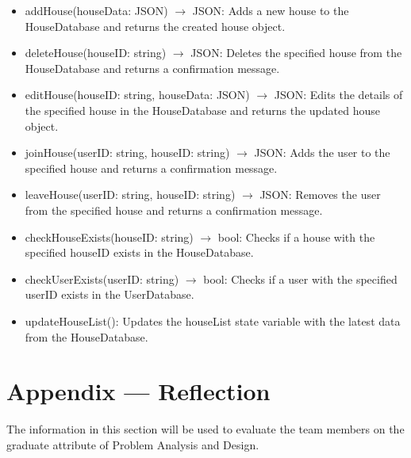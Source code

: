 \documentclass[12pt, titlepage]{article}
\begin{document}
\begin{itemize}
  \item addHouse(houseData: JSON) $\rightarrow$ JSON: Adds a new house to the HouseDatabase and returns the created house object.
  \item deleteHouse(houseID: string) $\rightarrow$ JSON: Deletes the specified house from the HouseDatabase and returns a confirmation message.
  \item editHouse(houseID: string, houseData: JSON) $\rightarrow$ JSON: Edits the details of the specified house in the HouseDatabase and returns the updated house object.
  \item joinHouse(userID: string, houseID: string) $\rightarrow$ JSON: Adds the user to the specified house and returns a confirmation message.
  \item leaveHouse(userID: string, houseID: string) $\rightarrow$ JSON: Removes the user from the specified house and returns a confirmation message.
  \item checkHouseExists(houseID: string) $\rightarrow$ bool: Checks if a house with the specified houseID exists in the HouseDatabase.
  \item checkUserExists(userID: string) $\rightarrow$ bool: Checks if a user with the specified userID exists in the UserDatabase.
  \item updateHouseList(): Updates the houseList state variable with the latest data from the HouseDatabase.
\end{itemize}

\newpage{}

\section*{Appendix --- Reflection}

The information in this section will be used to evaluate the team members on the
graduate attribute of Problem Analysis and Design.


\end{document}
